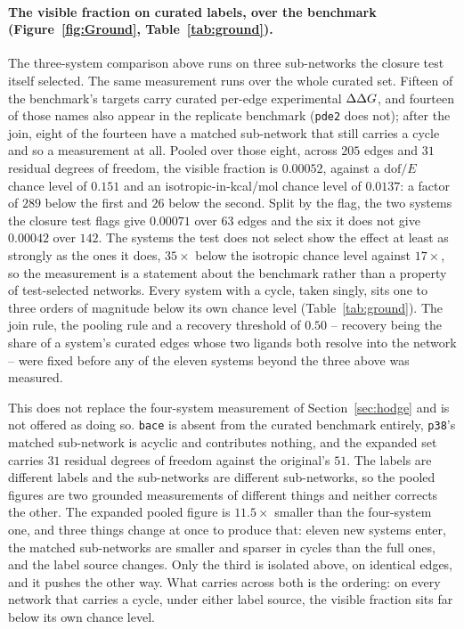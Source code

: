\paragraph{The visible fraction on curated labels, over the benchmark
(Figure~\ref{fig:Ground}, Table~\ref{tab:ground}).} The three-system comparison above runs on
three sub-networks the closure test itself selected. The same measurement runs over the whole
curated set. Fifteen of the benchmark's targets carry curated per-edge experimental $\Delta\Delta G$, and
fourteen of those names also appear in the replicate benchmark (\texttt{pde2} does not); after the
join, eight of the fourteen have a matched sub-network that still carries a cycle and so a
measurement at all. Pooled over those eight, across $205$ edges and $31$ residual degrees of
freedom, the visible fraction is $0.00052$, against a $\mathrm{dof}/E$ chance level of $0.151$ and
an isotropic-in-kcal/mol chance level of $0.0137$: a factor of $289$ below the first and $26$ below
the second. Split by the flag, the two systems the closure test
flags give $0.00071$ over $63$ edges and the six it does not give $0.00042$ over $142$. The systems
the test does not select show the effect at least as strongly as the ones it does, $35\times$ below
the isotropic chance level against $17\times$, so the measurement is a statement about the
benchmark rather than a property of test-selected networks. Every system with a cycle, taken
singly, sits one to three orders of magnitude below its own chance level (Table~\ref{tab:ground}).
The join rule, the pooling rule and a recovery threshold of $0.50$ -- recovery being the share
of a system's curated edges whose two ligands both resolve into the network -- were fixed before
any of the eleven systems beyond the three above was measured.

This does not replace the four-system measurement of Section~\ref{sec:hodge} and is not offered as
doing so. \texttt{bace} is absent from the curated benchmark entirely, \texttt{p38}'s matched
sub-network is acyclic and contributes nothing, and the expanded set carries $31$ residual degrees
of freedom against the original's $51$. The labels are different labels and the sub-networks are
different sub-networks, so the pooled figures are two grounded measurements of different things and
neither corrects the other. The expanded pooled figure is $11.5\times$ smaller than the
four-system one, and three things change at once to produce that: eleven new systems enter, the
matched sub-networks are smaller and sparser in cycles than the full ones, and the label source
changes. Only the third is isolated above, on identical edges, and it pushes the other way. What
carries across both is the ordering: on every network that carries a cycle, under either label
source, the visible fraction sits far below its own chance level.

